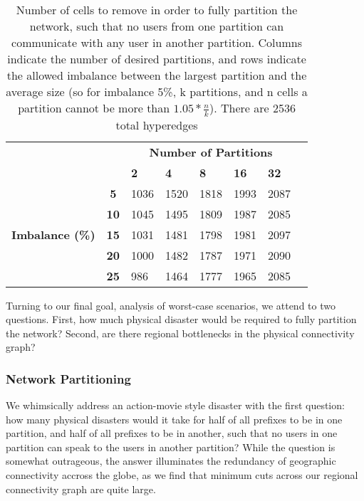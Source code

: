     \begin{table}
        \centering
        \begin{tabular}{lc|l|l|l|l|l|l}
            &&\multicolumn{5}{c}{\bf Number of Partitions}\\
            &&{\bf 2}&{\bf 4}&{\bf 8}&{\bf 16}&{\bf 32}\\
            \hline
            \multirow{5}{*}{\begin{sideways}{\bf Imbalance (\%)}\end{sideways}}
            &{\bf 5}&1036&1520&1818&1993&2087\\
            &{\bf 10}&1045&1495&1809&1987&2085\\
            &{\bf 15}&1031&1481&1798&1981&2097\\
            &{\bf 20}&1000&1482&1787&1971&2090\\
            &{\bf 25}&986&1464&1777&1965&2085\\
        \end{tabular}
        \caption[]{\label{tbl:hmetis} Number of cells to remove in order to fully partition the network, such that no users from one partition can communicate with any user in another partition. Columns indicate the number of desired partitions, and rows indicate the allowed imbalance between the largest partition and the average size (so for imbalance 5\%, k partitions, and n cells a partition cannot be more than $1.05 * \frac{n}{k}$). There are 2536 total hyperedges}
    \end{table}
        
    Turning to our final goal, analysis of worst-case scenarios, we attend to two questions. 
    First, how much physical disaster would be required to fully partition the network?         
    Second, are there regional bottlenecks in the physical connectivity graph?

    \subsubsection*{Network Partitioning}
    We whimsically address an action-movie style disaster with the first question: how many physical disasters would it take for half of all prefixes to be in one partition, and half of all prefixes to be in another, such that no users in one partition can speak to the users in another partition?
    While the question is somewhat outrageous, the answer illuminates the redundancy of geographic connectivity accross the globe, as we find that minimum cuts across our regional connectivity graph are quite large.
    

